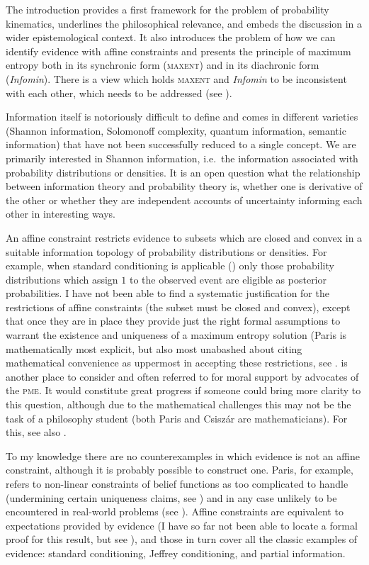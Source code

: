 \documentclass[11pt]{article}
\begin{document}
The introduction provides a first framework for the problem of
probability kinematics, underlines the philosophical relevance, and
embeds the discussion in a wider epistemological context. It also
introduces the problem of how we can identify evidence with affine
constraints and presents the principle of maximum entropy both in its
synchronic form (\textsc{maxent}) and in its diachronic form
(\emph{Infomin}). There is a view which holds \textsc{maxent} and
\emph{Infomin} to be inconsistent with each other, which needs to be
addressed (see ). 

Information itself is notoriously difficult to define and comes in
different varieties (Shannon information, Solomonoff complexity,
quantum information, semantic information) that have not been
successfully reduced to a single concept. We are primarily interested
in Shannon information, i.e.\ the information associated with
probability distributions or densities. It is an open question what
the relationship between information theory and probability theory is,
whether one is derivative of the other or whether they are independent
accounts of uncertainty informing each other in interesting ways.

An affine constraint restricts evidence to subsets which are closed
and convex in a suitable information topology of probability
distributions or densities. For example, when standard conditioning is
applicable () only those probability distributions which assign $1$ to
the observed event are eligible as posterior probabilities. I have not
been able to find a systematic justification for the restrictions of
affine constraints (the subset must be closed and convex), except that
once they are in place they provide just the right formal assumptions
to warrant the existence and uniqueness of a maximum entropy solution
(Paris is mathematically most explicit, but also most unabashed about
citing mathematical convenience as uppermost in accepting these
restrictions, see .  is
another place to consider and often referred to for moral support by
advocates of the \textsc{pme}. It would constitute great progress if
someone could bring more clarity to this question, although due to the
mathematical challenges this may not be the task of a philosophy
student (both Paris and Csisz{\'a}r are mathematicians). For this, see
also .

To my knowledge there are no counterexamples in which evidence is not
an affine constraint, although it is probably possible to construct
one. Paris, for example, refers to non-linear constraints of belief
functions as too complicated to handle (undermining certain uniqueness
claims, see ) and in any case unlikely to be
encountered in real-world problems (see ). Affine
constraints are equivalent to expectations provided by evidence (I
have so far not been able to locate a formal proof for this result,
but see ), and those in turn cover all the
classic examples of evidence: standard conditioning, Jeffrey
conditioning, and partial information.
\end{document}

